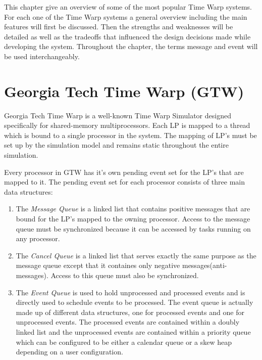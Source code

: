 \documentclass[11pt]{book}
\begin{document}
This chapter give an overview of some of the most popular Time Warp systems. For each one of the
Time Warp systems a general overview including the main features will first be discussed. Then
the strengths and weaknesses will be detailed as well as the tradeoffs that influenced the design
decisions made while developing the system. Throughout the chapter, the terms message and event
will be used interchangeably.


\section{Georgia Tech Time Warp (GTW)}

Georgia Tech Time Warp is a well-known Time Warp Simulator designed specifically for shared-memory
multiprocessors. Each LP is mapped to a thread which is bound to a single processor in the system.
The mapping of LP's must be set up by the simulation model and remains static throughout the entire
simulation.

Every processor in GTW has it's own pending event set for the LP's that are mapped to it. The pending
event set for each processor consists of three main data structures\cite{das-94}:

\begin{enumerate}

    \item The \emph{Message Queue} is a linked list that contains positive messages that are bound
        for the LP's mapped to the owning processor. Access to the message queue must be synchronized
        because it can be accessed by tasks running on any processor.
    \item The \emph{Cancel Queue} is a linked list that serves exactly the same purpose as the
        message queue except that it containes only negative messages(anti-messages).
        Access to this queue must also be synchronized.
    \item The \emph{Event Queue} is used to hold unprocessed and processed events and is directly
        used to schedule events to be processed. The event queue is actually made up of different
        data structures, one for processed events and one for unprocessed events. The processed
        events are contained within a doubly linked list and the unprocessed events are contained
        within a priority queue which can be configured to be either a calendar queue or a skew
        heap depending on a user configuration.

\end{enumerate}
\end{document}
